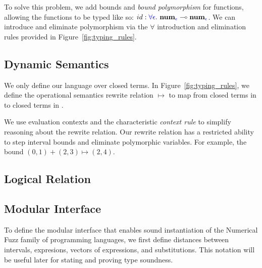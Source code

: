 To solve this problem, we add bounds and \textit{bound polymorphism} for
functions, allowing the functions to be typed like so: $id : \textcolor{blue}{\forall
\epsilon.} ~ \textbf{num}_{\textcolor{blue}{\epsilon}} \multimap
\textbf{num}_{\textcolor{blue}{\epsilon}}$. We can introduce and eliminate polymorphism via
the $\forall$ introduction and elimination rules provided in
Figure~\ref{fig:typing_rules}.



\subsection{Dynamic Semantics} \label{sec:dynamic-semantics}
We only define our language over closed terms. In Figure~\ref{fig:typing_rules},
we define the operational semantics rewrite relation $\mapsto$ to map from
closed terms in \Lang to closed terms in \Lang.

We use evaluation contexts and the characteristic \textit{context rule} to
simplify reasoning about the rewrite relation. Our rewrite relation has a
restricted ability to step interval bounds and eliminate polymorphic variables.
For example, the bound $(0, 1) + (2,3) \mapsto (2, 4)$.



\subsection{Logical Relation} \label{sec:logical-relation}


\subsection{Modular Interface} \label{sec:interface}
To define the modular interface that enables sound instantiation of the
Numerical Fuzz family of programming languages, we first define distances
between intervals, expresions, vectors of expressions, and substitutions. This
notation will be useful later for stating and proving type soundness.

